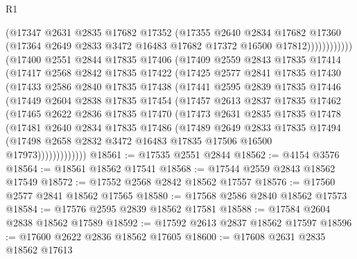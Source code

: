 \begin{lexlean}{R1}
\begin{coremodule}
                      (@17347
                        @2631
                        @2835
                        @17682
                        @17352
                        (@17355
                          @2640
                          @2834
                          @17682
                          @17360
                          (@17364 @2649 @2833 @3472 @16483 @17682 @17372 @16500 @17812))))))))))))
    (@17400
      @2551
      @2844
      @17835
      @17406
      (@17409
        @2559
        @2843
        @17835
        @17414
        (@17417
          @2568
          @2842
          @17835
          @17422
          (@17425
            @2577
            @2841
            @17835
            @17430
            (@17433
              @2586
              @2840
              @17835
              @17438
              (@17441
                @2595
                @2839
                @17835
                @17446
                (@17449
                  @2604
                  @2838
                  @17835
                  @17454
                  (@17457
                    @2613
                    @2837
                    @17835
                    @17462
                    (@17465
                      @2622
                      @2836
                      @17835
                      @17470
                      (@17473
                        @2631
                        @2835
                        @17835
                        @17478
                        (@17481
                          @2640
                          @2834
                          @17835
                          @17486
                          (@17489
                            @2649
                            @2833
                            @17835
                            @17494
                            (@17498
                              @2658
                              @2832
                              @3472
                              @16483
                              @17835
                              @17506
                              @16500
                              @17973)))))))))))))
@18561 := @17535 @2551 @2844
@18562 := @4154 @3576
@18564 := @18561 @18562 @17541
@18568 := @17544 @2559 @2843 @18562 @17549
@18572 := @17552 @2568 @2842 @18562 @17557
@18576 := @17560 @2577 @2841 @18562 @17565
@18580 := @17568 @2586 @2840 @18562 @17573
@18584 := @17576 @2595 @2839 @18562 @17581
@18588 := @17584 @2604 @2838 @18562 @17589
@18592 := @17592 @2613 @2837 @18562 @17597
@18596 := @17600 @2622 @2836 @18562 @17605
@18600 := @17608 @2631 @2835 @18562 @17613

\end{coremodule}
\end{lexlean}
